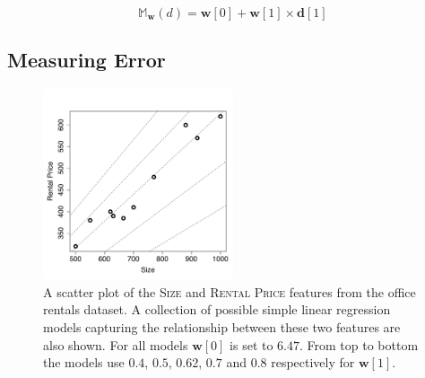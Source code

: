 \documentclass[xcolor={table}]{beamer}
\newcommand{\featN}[1]{\textsc{#1}}
\begin{document}
 \begin{frame} 
\begin{center}
\begin{equation}
\mathbb{M}_{\mathbf{w}}(d) = \mathbf{w}[0] + \mathbf{w}[1] \times \mathbf{d}[1] \label{eq:simpleLinearRegression}
\end{equation}
\end{center}
\end{frame}

\subsection{Measuring Error}

 \begin{frame} 
 \begin{figure}[htb]
\begin{center}
\includegraphics[width=0.5\textwidth]{./images/linearRegressionDemoMultipleModels.pdf}
\caption{A scatter plot of the \featN{Size} and \featN{Rental Price} features from the office rentals dataset. A collection of possible simple linear regression models capturing the relationship between these two features are also shown. For all models $\mathbf{w}[0]$ is set to $6.47$. From top to bottom the models use $0.4$, $0.5$, $0.62$, $0.7$ and $0.8$ respectively for $\mathbf{w}[1]$.}
\label{fig:officeSizesAndPricesWithMultipleModels}
\end{center}
\end{figure}
\end{frame} 
		
\end{document}
